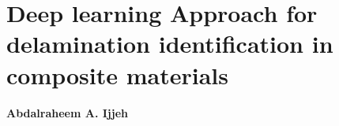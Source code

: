 \documentclass[b5paper, 11pt, openany, titlepage]{book}
\begin{document}

\chapter[Short title]{Deep learning Approach for delamination identification in composite materials}

\textbf{Abdalraheem A. Ijjeh}

\newpage






 
 


\end{document}
